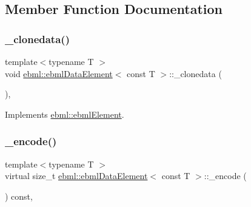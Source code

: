 \subsection{Member Function Documentation}
\mbox{\label{classebml_1_1ebmlDataElement_3_01const_01T_01_4_a46a152b21a6fc49a331e61f29c486ebe}} 
\subsubsection{\texorpdfstring{\+\_\+clonedata()}{\_clonedata()}}
{\footnotesize\ttfamily template$<$typename T $>$ \\
void \mbox{\hyperlink{classebml_1_1ebmlDataElement}{ebml\+::ebml\+Data\+Element}}$<$ const T $>$\+::\+\_\+clonedata (\begin{DoxyParamCaption}\item[{const \mbox{\hyperlink{classebml_1_1ebmlElement}{ebml\+Element}} $\ast$}]{ }\end{DoxyParamCaption})\hspace{0.3cm}{\ttfamily [protected]}, {\ttfamily [virtual]}}



Implements \mbox{\hyperlink{classebml_1_1ebmlElement_a3ebe3aa75b62971f385c01f27c807a02}{ebml\+::ebml\+Element}}.

\mbox{\label{classebml_1_1ebmlDataElement_3_01const_01T_01_4_aac802a573eaeaa5b856d5e74deb9dd3a}} 
\subsubsection{\texorpdfstring{\+\_\+encode()}{\_encode()}}
{\footnotesize\ttfamily template$<$typename T $>$ \\
virtual size\+\_\+t \mbox{\hyperlink{classebml_1_1ebmlDataElement}{ebml\+::ebml\+Data\+Element}}$<$ const T $>$\+::\+\_\+encode (\begin{DoxyParamCaption}\item[{char $\ast$}]{ }\end{DoxyParamCaption}) const\hspace{0.3cm}{\ttfamily [protected]}, {\ttfamily [virtual]}}



